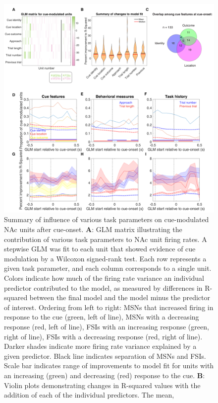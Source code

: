 \documentclass[11pt]{article}
\newcommand{\bsf}[1]{\textbf{#1}}
\providecommand{\DIFaddendFL}{} %
\DeclareRobustCommand{\DIFaddendFL}{\DIFOaddendFL \let\includegraphics\DIFOincludegraphics} %
\begin{document}
 \begin{figure}[ht!]
\centering
\includegraphics[height=0.5\textheight]{Fig 5 - GLM.pdf}
\DIFaddendFL \caption{Summary of influence of various task parameters on cue-modulated NAc
units after cue-onset. \bsf{A}: GLM matrix illustrating the contribution of
various task parameters to NAc unit firing rates. A stepwise GLM was fit to
each unit that showed evidence of cue modulation by a Wilcoxon signed-rank
test. Each row represents a given task parameter, and each column corresponds
to a single unit. Colors indicate how much of the firing rate variance an
individual predictor contributed to the model, as measured by differences in
R-squared between the final model and the model minus the predictor of
interest. Ordering from left to right: MSNs that increased firing in response
to the cue (green, left of line), MSNs with a decreasing response (red, left
of line), FSIs with an increasing response (green, right of line), FSIs with a
decreasing response (red, right of line). Darker shades indicate more firing
rate variance explained by a given predictor. Black line indicates separation
of MSNs and FSIs. Scale bar indicates range of improvements to model fit for units with an increasing (green) and decreasing (red) response to the cue. \bsf{B}: Violin plots demonstrating changes in R-squared
values with the addition of each of the individual predictors. The mean,
}
\end{figure}
\end{document}
